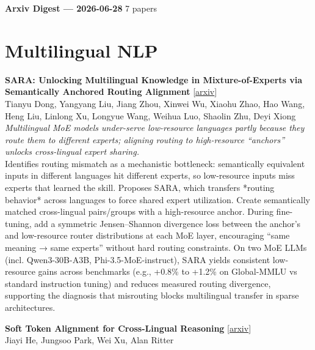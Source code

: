 \documentclass[12pt,letterpaper]{article}
\begin{document}
{\footnotesize\textbf{Arxiv Digest --- 2026-06-28} \hfill 7 papers}

\smallskip

\section*{Multilingual NLP}

{\small\textbf{SARA: Unlocking Multilingual Knowledge in Mixture-of-Experts via Semantically Anchored Routing Alignment}} {\scriptsize[\href{https://arxiv.org/abs/2606.25821}{arxiv}]}\\
{\scriptsize Tianyu Dong, Yangyang Liu, Jiang Zhou, Xinwei Wu, Xiaohu Zhao, Hao Wang, Heng Liu, Linlong Xu, Longyue Wang, Weihua Luo, Shaolin Zhu, Deyi Xiong}\\

{\small\textit{Multilingual MoE models under-serve low-resource languages partly because they route them to different experts; aligning routing to high-resource ``anchors'' unlocks cross-lingual expert sharing.}}\\[1pt]
{\footnotesize Identifies routing mismatch as a mechanistic bottleneck: semantically equivalent inputs in different languages hit different experts, so low-resource inputs miss experts that learned the skill. Proposes SARA, which transfers *routing behavior* across languages to force shared expert utilization. Create semantically matched cross-lingual pairs/groups with a high-resource anchor. During fine-tuning, add a symmetric Jensen--Shannon divergence loss between the anchor's and low-resource router distributions at each MoE layer, encouraging ``same meaning → same experts'' without hard routing constraints. On two MoE LLMs (incl. Qwen3-30B-A3B, Phi-3.5-MoE-instruct), SARA yields consistent low-resource gains across benchmarks (e.g., +0.8\% to +1.2\% on Global-MMLU vs standard instruction tuning) and reduces measured routing divergence, supporting the diagnosis that misrouting blocks multilingual transfer in sparse architectures.}

\medskip

{\small\textbf{Soft Token Alignment for Cross-Lingual Reasoning}} {\scriptsize[\href{https://arxiv.org/abs/2606.26466}{arxiv}]}\\
{\scriptsize Jiayi He, Jungsoo Park, Wei Xu, Alan Ritter}\\
\end{document}
